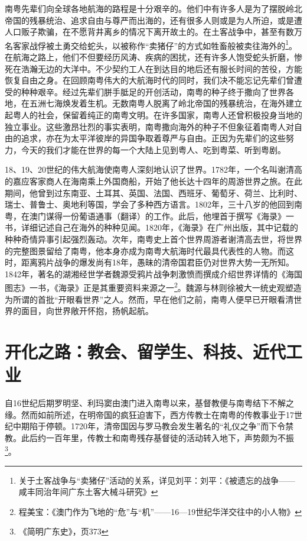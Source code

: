 南粤先辈们向全球各地航海的路程是十分艰辛的。他们中有许多人是为了摆脱岭北帝国的残暴统治、追求自由与尊严而出海的，还有很多人则或是为人所迫，或是遭人口贩子欺骗，在不愿背井离乡的情况下离开故土的。在土客战争中，甚至有数万名客家战俘被土勇交给蛇头，以被称作“卖猪仔”的方式如牲畜般被卖往海外的\footnote{关于土客战争与“卖猪仔”活动的关系，详见刘平：刘平：《被遗忘的战争——咸丰同治年间广东土客大械斗研究》}。在航海之路上，他们不但要经历风涛、疾病的困扰，还有许多人饱受蛇头折磨，惨死在浩瀚无边的大洋中。不少契约工人在到达目的地后还有服长时间的苦役，方能恢复自由之身。在回顾南粤伟大的大航海时代的同时，我们决不能忘记先辈们曾遭受的种种艰辛。经过先辈们胼手胝足的开创活动，南粤的种子终于撒向了世界各地，在五洲七海焕发着生机。无数南粤人脱离了岭北帝国的残暴统治，在海外建立起粤人的社会，保留着纯正的南粤文明。在许多国家，南粤人还曾积极投身当地的独立事业。这些激昂壮烈的事实表明，南粤撒向海外的种子不但象征着南粤人对自由的追求，亦在为太平洋彼岸的异国争取着尊严与自由。正因为先辈们的这些努力，今天的我们才能在世界的每一个大陆上见到粤人、吃到粤菜、听到粤剧。

18、19、20世纪的伟大航海使南粤人深刻地认识了世界。1782年，一个名叫谢清高的嘉应客家商人在海南乘上外国商船，开始了他长达十四年的周游世界之旅。在此期间，他曾到过东南亚、土耳其、英国、法国、西班牙、葡萄牙、荷兰、比利时、瑞士、普鲁士、奥地利等国，学会了多种西方语言。1802年，三十八岁的他回到南粤，在澳门谋得一份葡语通事（翻译）的工作。此后，他埋首于撰写《海录》一书，详细记述自己在海外的种种见闻。1820年，《海录》在广州出版，其中记载的种种奇情异事引起强烈轰动。次年，南粤史上首个世界周游者谢清高去世，将世界的完整图景留给了南粤，他本身亦成为南粤大航海时代最具代表性的人物。而这时，距离鸦片战争的爆发尚有18年，愚昧的清帝国君臣仍对世界大势一无所知。1842年，著名的湖湘经世学者魏源受鸦片战争刺激愤而撰成介绍世界详情的《海国图志》一书，《海录》正是其重要资料来源之一\footnote{程美宝：《澳门作为飞地的“危”与“机”——16—19世纪华洋交往中的小人物》}。魏源与林则徐被大一统史观塑造为所谓的首批“开眼看世界”之人。然而，早在他们之前，南粤人便早已开眼看清世界的面目，向世界敞开怀抱，扬帆起航。

\section{开化之路：教会、留学生、科技、近代工业}

\indent 自16世纪后期罗明坚、利玛窦由澳门进入南粤以来，基督教便与南粤结下不解之缘。然而如前所述，在明帝国的疯狂迫害下，西方传教士在南粤的传教事业于17世纪中期陷于停顿。1720年，清帝国因与罗马教会发生著名的“礼仪之争”而下令禁教。此后约一百年里，传教士和南粤残存基督徒的活动转入地下，声势颇为不振\footnote{《简明广东史》，页373}。

